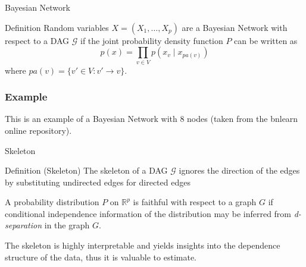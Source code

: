 \documentclass{beamer}
\begin{document}
\begin{frame}{Bayesian Network}
\begin{exampleblock}{Definition}
Random variables $X = (X_1,\ldots, X_p)$ are a Bayesian Network with respect to a DAG $\mathcal{G}$ if the joint probability density function $P$ can be written as
$$ p(x) = \prod_{v \in V} p(x_v \mid x_{pa(v)}) $$
where $pa(v) = \{ v' \in V :  v' \rightarrow v\}$.
\end{exampleblock}
\end{frame}

\begin{frame}
\frametitle{Example}
This is an example of a Bayesian Network with 8 nodes (taken from the bnlearn online repository).
\begin{figure}
  \centering
\end{figure}

\end{frame}

\begin{frame}{Skeleton}

\begin{exampleblock}{ Definition (Skeleton) } 
The skeleton of a DAG $\mathcal{G}$ ignores the direction of the edges by substituting undirected edges for directed edges
\end{exampleblock}

A probability distribution $P$ on $\mathbb{R}^p$ is faithful with respect to a graph $G$ if conditional independence information of the distribution may be inferred from \textit{d-separation} in the graph $G$. 

\vspace{10pt}

The skeleton is highly interpretable and yields insights into the dependence structure of the data, thus it is valuable to estimate.

\end{frame}
\end{document}
